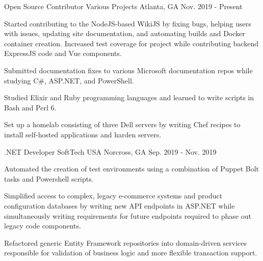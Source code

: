 

\begin{cventries}

\cventry
{Open Source Contributor} %
{Various Projects} %
{Atlanta, GA} %
{Nov. 2019 - Present} %
{
    \begin{cvitems} %
        \item {Started contributing to the NodeJS-based WikiJS by fixing bugs, helping users with issues, updating site documentation, and automating builds and Docker container creation. Increased test coverage for project while contributing backend ExpressJS code and Vue components.}
        \item {Submitted documentation fixes to various Microsoft documentation repos while studying C\#, ASP.NET, and PowerShell. }
        \item {Studied Elixir and Ruby programming languages and learned to write scripts in Bash and Perl 6.}
        \item {Set up a homelab consisting of three Dell servers by writing Chef recipes to install self-hosted applications and harden servers.}
    \end{cvitems}
}

  \cventry
    {.NET Developer} %
    {SoftTech USA} %
    {Norcross, GA} %
    {Sep. 2019 - Nov. 2019} %
    {
      \begin{cvitems} %
        \item {Automated the creation of test environments using a combination of Puppet Bolt tasks and Powershell scripts.}
        \item {Simplified access to complex, legacy e-commerce systems and product configuration databases by writing new API endpoints in ASP.NET while simultaneously writing requirements for future endpoints required to phase out legacy code components. }
        \item {Refactored generic Entity Framework repositories into domain-driven services responsible for validation of business logic and more flexible transaction support.}
      \end{cvitems}
    }


\end{cventries}
